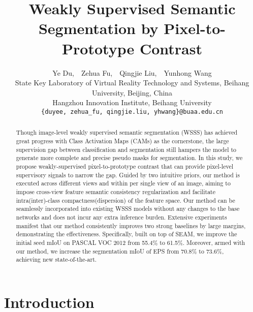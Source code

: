 \documentclass[10pt,twocolumn,letterpaper]{article}
\begin{document}
\title{Weakly Supervised Semantic Segmentation by Pixel-to-Prototype Contrast}


\author{Ye Du,\ \  Zehua Fu,\ \  Qingjie Liu\footnotemark[1],\ \  Yunhong Wang\\
State Key Laboratory of Virtual Reality Technology and Systems, Beihang University, Beijing, China\\
Hangzhou Innovation Institute, Beihang University\\
{\tt\small \{duyee, zehua\_fu, qingjie.liu, yhwang\}@buaa.edu.cn}
}



\maketitle

\renewcommand{\thefootnote}{\fnsymbol{footnote}}  

\begin{abstract}
  Though image-level weakly supervised semantic segmentation (WSSS) has achieved great progress with Class Activation Maps (CAMs) as the cornerstone, the large supervision gap between classification and segmentation still hampers the model to generate more complete and precise pseudo masks for segmentation.
  In this study, we propose weakly-supervised pixel-to-prototype contrast that can provide pixel-level supervisory signals to narrow the gap.
  Guided by two intuitive priors, our method is executed across different views and within per single view of an image, aiming to impose cross-view feature semantic consistency regularization and facilitate intra(inter)-class compactness(dispersion) of the feature space.
  Our method can be seamlessly incorporated into existing WSSS models without any changes to the base networks and does not incur any extra inference burden. 
  Extensive experiments manifest that our method consistently improves two strong baselines by large margins, demonstrating the effectiveness.
  Specifically, built on top of SEAM, we improve the initial seed mIoU on PASCAL VOC 2012 from 55.4\% to 61.5\%.
  Moreover, armed with our method, we increase the segmentation mIoU of EPS from 70.8\% to 73.6\%, achieving new state-of-the-art. 
\end{abstract}

\section{Introduction}
\label{sec:intro}
\end{document}
